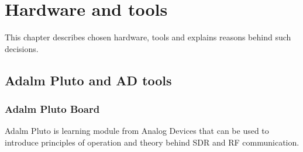 \documentclass[en,printmode]{mgr}
\begin{document}
\chapter{Hardware and tools}
	This chapter describes chosen hardware, tools and explains reasons behind such decisions.
	\section{Adalm Pluto and AD tools}
		\subsection*{Adalm Pluto Board}
			Adalm Pluto is learning module from Analog Devices that can be used to introduce 
			principles of operation and theory behind SDR and RF communication.
			
\end{document}
